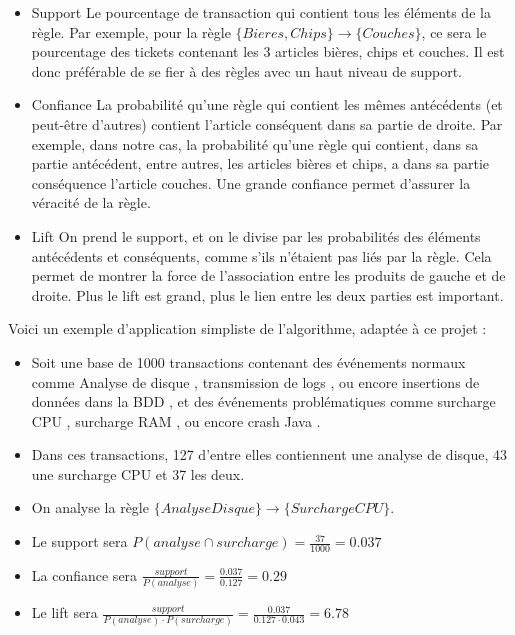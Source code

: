 \documentclass[paper=a4, fontsize=11pt]{scrartcl}
\begin{document}
\begin{itemize}
    \item Support
    \subitem Le pourcentage de transaction qui contient tous les éléments de la règle. Par exemple, pour la règle $\{Bieres, Chips\} \rightarrow \{Couches\}$, ce sera le pourcentage des tickets contenant les 3 articles bières, chips et couches. Il est donc préférable de se fier à des règles avec un haut niveau de support.
    \item Confiance
    \subitem La probabilité qu'une règle qui contient les mêmes antécédents (et peut-être d'autres) contient l'article conséquent dans sa partie de droite. Par exemple, dans notre cas, la probabilité qu'une règle qui contient, dans sa partie antécédent, entre autres, les articles bières et chips, a dans sa partie \og conséquence \fg l'article couches. Une grande confiance permet d'assurer la véracité de la règle.
    \item Lift
    \subitem On prend le support, et on le divise par les probabilités des éléments antécédents et conséquents, comme s'ils n'étaient pas liés par la règle. Cela permet de montrer la force de l'association entre les produits de gauche et de droite. Plus le lift est grand, plus le lien entre les deux parties est important.
\end{itemize}

Voici un exemple d'application simpliste de l'algorithme, adaptée à ce projet :

\begin{itemize}
    \item Soit une base de 1000 transactions contenant des événements normaux comme \og Analyse de disque \fg, \og transmission de logs \fg, ou encore \og insertions de données dans la BDD \fg, et des événements problématiques comme \og surcharge CPU \fg, \og surcharge RAM \fg, ou encore \og crash Java \fg.
    \item Dans ces transactions, 127 d'entre elles contiennent une analyse de disque, 43 une surcharge CPU et 37 les deux.
    \item On analyse la règle $\{AnalyseDisque\} \rightarrow \{SurchargeCPU\}$.
    \item Le support sera $P(analyse \cap surcharge) = \frac{37}{1000} = 0.037$
    \item La confiance sera $\frac{support}{P(analyse)} = \frac{0.037}{0.127} = 0.29$
    \item Le lift sera $\frac{support}{P(analyse)\cdot P(surcharge)} = \frac{0.037}{0.127 \cdot 0.043} = 6.78$
\end{itemize}
\end{document}
